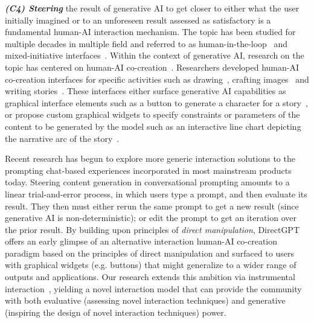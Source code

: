 \vspace{5pt}\textit{\textbf{(C4) Steering}} the result of generative AI to get closer to either what the user initially imagined or to an unforeseen result assessed as satisfactory is a fundamental human-AI interaction mechanism. The topic has been studied for multiple decades in multiple field and referred to as human-in-the-loop~\cite{wu2022survey} and mixed-initiative interfaces~\cite{horvitz1999principles}. Within the context of generative AI, research on the topic has centered on human-AI co-creation~\cite{davis2015enactive}. Researchers developed human-AI co-creation interfaces for specific activities such as drawing~\cite{oh_i_2018}, crafting images~\cite{chung_promptpaint_2023} and writing stories~\cite{chung_talebrush_2022, zhang_storydrawer_2022}. These interfaces either surface generative AI capabilities as graphical interface elements such as a button to generate a character for a story~\cite{zhang_storydrawer_2022}, or propose custom graphical widgets to specify constraints or parameters of the content to be generated by the model such as an interactive line chart depicting the narrative arc of the story~\cite{chung_talebrush_2022}.

Recent research has begun to explore more generic interaction solutions to the prompting chat-based experiences incorporated in most mainstream products today. Steering content generation in conversational prompting amounts to a linear trial-and-error process, in which users type a prompt, and then evaluate its result. They then must either rerun the same prompt to get a new result (since generative AI is non-deterministic); or edit the prompt to get an iteration over the prior result. By building upon principles of \textit{direct manipulation}, DirectGPT~\cite{masson_directgpt_2024} offers an early glimpse of an alternative interaction human-AI co-creation paradigm based on the principles of direct manipulation and surfaced to users with graphical widgets (e.g. buttons) that might generalize to a wider range of outputs and applications. Our research extends this ambition via instrumental interaction~\cite{beaudouin2000instrumental}, yielding a novel interaction model that can provide the community with both evaluative (assessing novel interaction techniques) and generative (inspiring the design of novel interaction techniques) power. 

